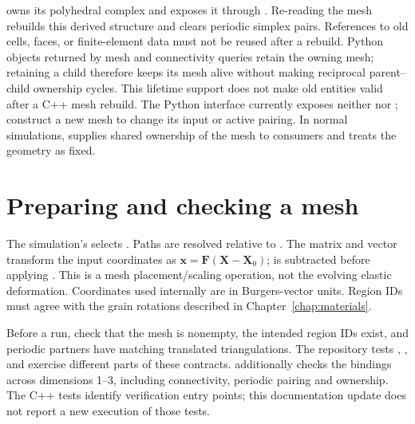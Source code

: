  owns its polyhedral complex and exposes it through . Re-reading the mesh rebuilds this derived structure and clears periodic simplex pairs. References to old cells, faces, or finite-element data must not be reused after a rebuild. Python objects returned by mesh and connectivity queries retain the owning mesh; retaining a child therefore keeps its mesh alive without making reciprocal parent--child ownership cycles. This lifetime support does not make old entities valid after a C++ mesh rebuild. The Python interface currently exposes neither  nor ; construct a new mesh to change its input or active pairing. In normal simulations,  supplies shared ownership of the mesh to consumers and treats the geometry as fixed.

\section{Preparing and checking a mesh}
The simulation's  selects . Paths are resolved relative to . The matrix  and vector  transform the input coordinates as $\bm x=\bm F(\bm X-\bm X_0)$;  is subtracted before applying . This is a mesh placement/scaling operation, not the evolving elastic deformation. Coordinates used internally are in Burgers-vector units. Region IDs must agree with the grain rotations described in Chapter~\ref{chap:materials}.

Before a run, check that the mesh is nonempty, the intended region IDs exist, and periodic partners have matching translated triangulations. The repository tests , ,  and  exercise different parts of these contracts.  additionally checks the bindings across dimensions 1--3, including connectivity, periodic pairing and ownership. The C++ tests identify verification entry points; this documentation update does not report a new execution of those tests.


